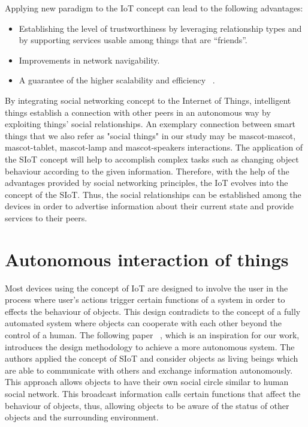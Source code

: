 Applying new paradigm to the IoT concept can lead to the following advantages:
\begin{itemize}
  \item Establishing the level of trustworthiness by leveraging relationship types and by
        supporting services usable among things that are “friends”.
  \item Improvements in network navigability.
  \item A guarantee of the higher scalability and efficiency ~\cite{atzori2012social}.
\end{itemize}

By integrating social networking concept to the Internet of Things, intelligent things
establish a connection with other peers in an autonomous way by exploiting things' social relationships.
An exemplary connection between smart things that we also refer as "social things" in our
study may be mascot-mascot, mascot-tablet, mascot-lamp and mascot-speakers interactions.
The application of the SIoT concept will help to accomplish complex tasks such as changing
object behaviour according to the given information.
Therefore, with the help of the advantages provided by social networking principles,
the IoT evolves into the concept of the SIoT\@.
Thus, the social relationships can be established among
the devices in order to advertise information about their current state and provide services to their peers.

\section{Autonomous interaction of things}
\label{sec:Autonomous interaction of things}
Most devices using the concept of IoT are designed to involve the user in the process
where user's actions trigger certain functions of a system in order to effects the behaviour of objects.
This design contradicts to the concept of a fully automated system where objects
can cooperate with each other beyond the control of a human.
The following paper ~\cite{okada2016autonomous}, which is an inspiration for our work,
introduces the design methodology to achieve a more autonomous system.
The authors applied the concept of SIoT and consider objects as living beings which are
able to communicate with others and exchange information autonomously.
This approach allows objects to have their own social circle similar to human social network.
This broadcast information calls certain functions that affect the behaviour of objects,
thus, allowing objects to be aware of the status of other objects and the surrounding environment.

